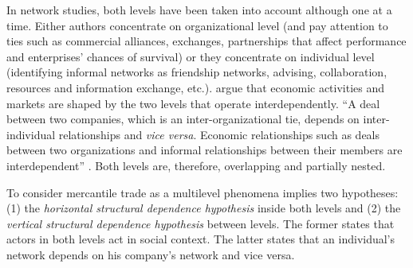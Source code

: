 \documentclass[a4paper, 12pt, openright, oneside, german, french, brazil, english]{abntex2}
\begin{document}
	In network studies, both levels have been taken into account although one at a time. Either authors concentrate on organizational level (and pay attention to ties such as commercial alliances, exchanges, partnerships that affect performance and enterprises' chances of survival) or they concentrate on individual level (identifying informal networks as friendship networks, advising, collaboration, resources and information exchange, etc.).  argue that economic activities and markets are shaped by the two levels that operate interdependently. ``A deal between two companies, which is an inter-organizational tie, depends on inter-individual relationships and \textit{vice versa}. Economic relationships such as deals between two organizations and informal relationships between their members are interdependent'' \cite[p. 246]{brailly2016market}. Both levels are, therefore, overlapping and partially nested.
	
	
	To consider mercantile trade as a multilevel phenomena implies two hypotheses: (1) the \textit{horizontal structural dependence hypothesis} inside both levels and (2) the \textit{vertical structural dependence hypothesis} between levels. The former states that actors in both levels act in social context. The latter states that an individual's network depends on his company's network and vice versa.
	
	
\end{document}
